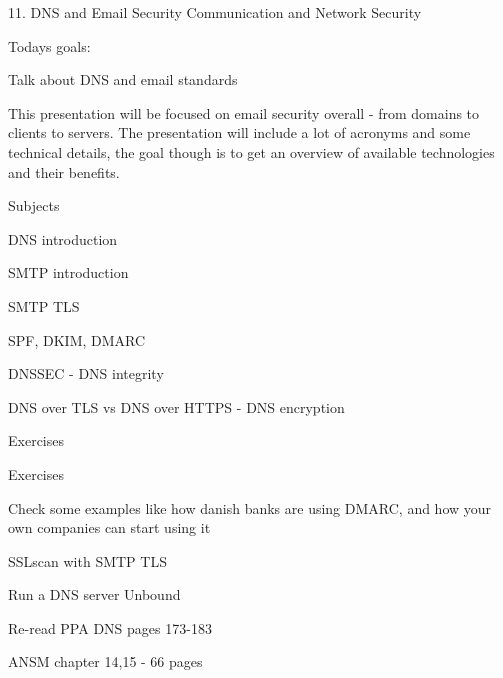 \documentclass[Screen16to9,17pt]{foils}
\begin{document}

\mytitlepage
{11. DNS and Email Security}
{Communication and Network Security \the\year}




Todays goals:
\begin{list2}
\item Talk about DNS and email standards
\end{list2}

This presentation will be focused on email security overall - from domains to clients to servers. The presentation will include a lot of acronyms and some technical details, the goal though is to get an overview of available technologies and their benefits.





\begin{list1}
\item Subjects
\begin{list2}
\item DNS introduction
\item SMTP introduction
\item SMTP TLS
\item SPF, DKIM, DMARC
\item DNSSEC - DNS integrity
\item DNS over TLS vs DNS over HTTPS - DNS encryption

Exercises
\end{list2}
\item Exercises
\begin{list2}
\item Check some examples like how danish banks are using DMARC, and how your own companies can start using it
\item SSLscan with SMTP TLS
\item Run a DNS server Unbound
\end{list2}
\end{list1}



\begin{list1}
\item Re-read PPA DNS pages 173-183
\item {}
\item {}
\item {}
\item ANSM chapter 14,15 - 66 pages
\end{list1}
\end{document}
